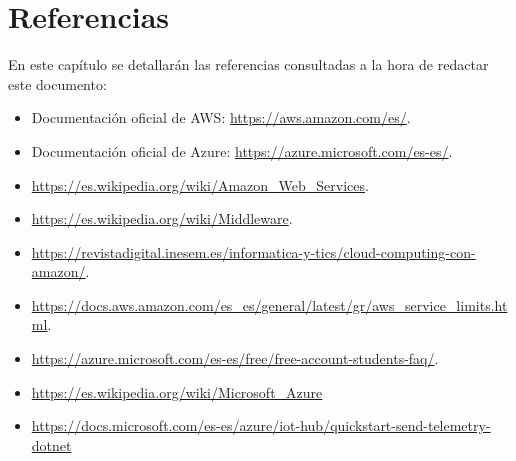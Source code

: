 \chapter{Referencias}
En este capítulo se detallarán las referencias consultadas a la hora de redactar este documento:
\begin{itemize}
	\item Documentación oficial de AWS: \url{https://aws.amazon.com/es/}.
	\item Documentación oficial de Azure: \url{https://azure.microsoft.com/es-es/}.
	\item \url{https://es.wikipedia.org/wiki/Amazon_Web_Services}.
	\item \url{https://es.wikipedia.org/wiki/Middleware}.
	\item \url{https://revistadigital.inesem.es/informatica-y-tics/cloud-computing-con-amazon/}.
	\item \url{https://docs.aws.amazon.com/es_es/general/latest/gr/aws_service_limits.html}.
	\item \url{https://azure.microsoft.com/es-es/free/free-account-students-faq/}.
	\item \url{https://es.wikipedia.org/wiki/Microsoft_Azure}
	\item \url{https://docs.microsoft.com/es-es/azure/iot-hub/quickstart-send-telemetry-dotnet}
\end{itemize}